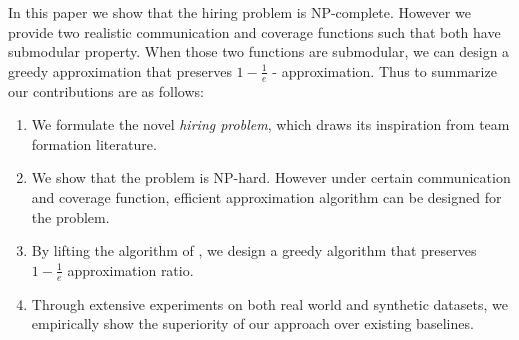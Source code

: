 In this paper we show that the hiring problem is NP-complete. However we provide two realistic communication and coverage functions such that both have submodular property. When those two functions are submodular, we can design a greedy approximation \cite{pmlr-v48-baib16} that preserves $1 - \frac{1}{e}$ - approximation. Thus to summarize our contributions are as follows:

\begin{enumerate}
\item We formulate the novel \textit{hiring problem}, which draws its inspiration from team formation literature.

\item We show that the problem is NP-hard. However under certain communication and coverage function, efficient approximation algorithm can be designed for the problem.

\item By lifting the algorithm of \cite{pmlr-v48-baib16}, we design a greedy algorithm that preserves $1 - \frac{1}{e}$ approximation ratio.

\item Through extensive experiments on both real world and synthetic datasets, we empirically show the superiority of our approach over existing baselines. 

\end{enumerate}